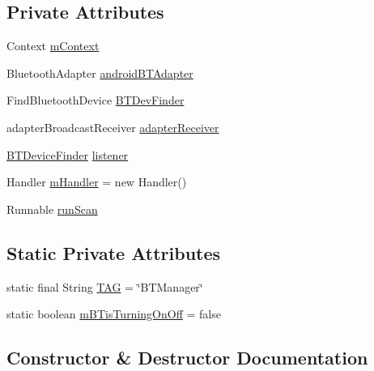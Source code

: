 \subsection*{Private Attributes}
\begin{DoxyCompactItemize}
\item 
Context \hyperlink{classcom_1_1social_1_1proximity_1_1_b_t_manager_a3e779dcacd6100ff356392817120fe32}{m\+Context}
\item 
Bluetooth\+Adapter \hyperlink{classcom_1_1social_1_1proximity_1_1_b_t_manager_aef973a2f766ef8803829daa2add3d2b1}{android\+B\+T\+Adapter}
\item 
Find\+Bluetooth\+Device \hyperlink{classcom_1_1social_1_1proximity_1_1_b_t_manager_ae80c9ffc4e8b87dc2c78c36d1bba55b9}{B\+T\+Dev\+Finder}
\item 
adapter\+Broadcast\+Receiver \hyperlink{classcom_1_1social_1_1proximity_1_1_b_t_manager_a3c995e0b95074f8cd2d5a48f2ad8abf8}{adapter\+Receiver}
\item 
\hyperlink{interfacecom_1_1social_1_1proximity_1_1_b_t_device_finder}{B\+T\+Device\+Finder} \hyperlink{classcom_1_1social_1_1proximity_1_1_b_t_manager_a5e3b7d29ab1ffb6832d42cc0c632f9ce}{listener}
\item 
Handler \hyperlink{classcom_1_1social_1_1proximity_1_1_b_t_manager_ad4f36a6603245d52ad541109d6c51ecf}{m\+Handler} = new Handler()
\item 
Runnable \hyperlink{classcom_1_1social_1_1proximity_1_1_b_t_manager_a6c26e87740201562e328883a23fb47cd}{run\+Scan}
\end{DoxyCompactItemize}
\subsection*{Static Private Attributes}
\begin{DoxyCompactItemize}
\item 
static final String \hyperlink{classcom_1_1social_1_1proximity_1_1_b_t_manager_a0e30700e3885560c22465cb8bd1542a2}{T\+A\+G} = \char`\"{}B\+T\+Manager\char`\"{}
\item 
static boolean \hyperlink{classcom_1_1social_1_1proximity_1_1_b_t_manager_aa287021937af9164c3e6ad7f9b210459}{m\+B\+Tis\+Turning\+On\+Off} = false
\end{DoxyCompactItemize}


\subsection{Constructor \& Destructor Documentation}
\hypertarget{classcom_1_1social_1_1proximity_1_1_b_t_manager_a9318f4d16d8ce1be6c1072f5da5f9633}{}
